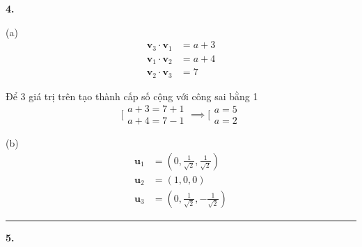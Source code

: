 \documentclass{article}
\newcommand\ddfrac[2]{\frac{\displaystyle #1}{\displaystyle #2}}
\begin{document}
    \begin{minipage}[t]{0.48\linewidth}
    \textbf{4.}

    (a) 
    \[ \begin{array}{cl}
        \textbf{v}_3 \cdot \textbf{v}_1 &= a + 3\\
        \textbf{v}_1 \cdot \textbf{v}_2 &= a + 4 \\
        \textbf{v}_2 \cdot \textbf{v}_3 &= 7 

    \end{array} \]

    Để 3 giá trị trên tạo thành cấp số cộng với công sai bằng 1 
    \[ \bigg[\begin{array}{l}
        a + 3 = 7 + 1 \\
        a + 4 = 7 - 1 
    \end{array} \implies \bigg[ \begin{array}{l}
        a = 5 \\
        a = 2 
    \end{array} \]

    (b) 
    \begin{equation*}
        \begin{split}
            \textbf{u}_1 &= \left( 0, \ddfrac{1}{\sqrt{2}} , \ddfrac{1}{\sqrt{2}}  \right) \\
            \textbf{u}_2 &= (1,0,0) \\
            \textbf{u}_3 &= \left( 0, \ddfrac{1}{\sqrt{2}} , - \ddfrac{1}{\sqrt{2}}  \right)
        \end{split}
    \end{equation*}


    \end{minipage}

    {\color{blue9} \rule{18cm}{0.3mm}}
\pagebreak
    

    \textbf{5.}
\end{document}
